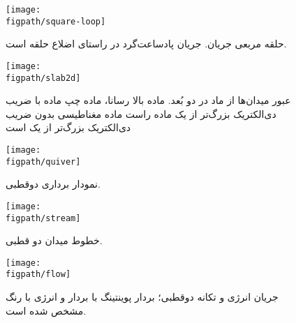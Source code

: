 \documentclass[12pt,a4paper]{article}
\newcommand{\figpath}{../figures}
\newcommand{\figwidth}{0.9\linewidth}
\begin{document}
	\begin{figure}
		\centering
		\texttt{[image: \\figpath/square-loop]}
		\caption{حلقه مربعی جریان. جریان پادساعت‌گرد در راستای اضلاع حلقه است.}
		\texttt{[image: \\figpath/slab2d]}
		\caption{عبور میدان‌ها از ماد در دو بُعد. ماده بالا رسانا، ماده چپ ماده با ضریب دی‌الکتریک بزرگ‌تر از یک 
			ماده راست ماده مغناطیسی بدون ضریب دی‌الکتریک بزرگ‌تر از یک است}
	\end{figure}
	\begin{figure}
		\centering
		\texttt{[image: \\figpath/quiver]}
		\caption{نمودار برداری دوقطبی.}
		\texttt{[image: \\figpath/stream]}
		\caption{خطوط میدان دو قطبی.}
	\end{figure}
	\begin{figure}
		\centering
		\texttt{[image: \\figpath/flow]}
		\caption{جریان انرژی و تکانه دوقطبی؛ بردار پوینتینگ با بردار و انرژی با رنگ مشخص شده است.}
	\end{figure}
\end{document}
